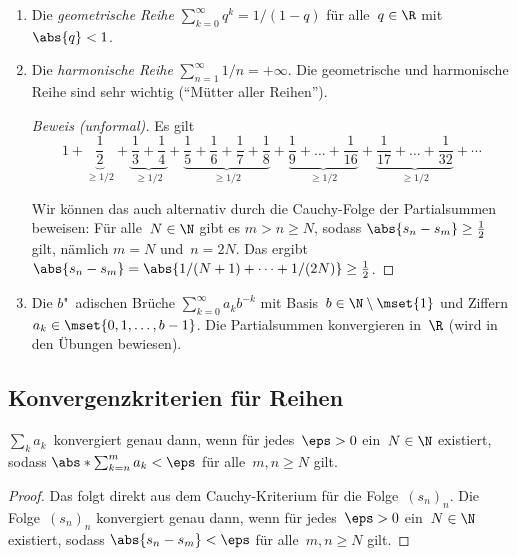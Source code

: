 \documentclass[a4paper]{article}
\begin{document}
\begin{example}\leavevmode
    \begin{enumerate}
        \item Die \emph{geometrische Reihe} $\sum_{k=0}^\infty q^k = 1/(1-q)$ für alle~$q \in \R$ mit~$\abs{q} < 1$.
        \item Die \emph{harmonische Reihe} $\sum_{n=1}^\infty 1/n = +\infty$. Die geometrische und harmonische Reihe sind sehr wichtig ("`Mütter aller Reihen"').
        \begin{proof}[Beweis (unformal)]
            Es gilt
            \begin{equation*}
                1 + \underbrace{\frac{1}{2}}_{\geq 1/2} + \underbrace{\frac{1}{3} + \frac{1}{4}}_{\geq 1/2} + \underbrace{\frac{1}{5} + \frac{1}{6} + \frac{1}{7} + \frac{1}{8}}_{\geq 1/2} + \underbrace{\frac{1}{9} + \dots + \frac{1}{16}}_{\geq 1/2} + \underbrace{\frac{1}{17} + \dots + \frac{1}{32}}_{\geq 1/2} + \cdots
            \end{equation*}

            Wir können das auch alternativ durch die Cauchy-Folge der Partialsummen beweisen: Für alle~$N \in \N$ gibt es $m > n \geq N$, sodass $\abs{s_n - s_m} \geq \frac{1}{2}$ gilt, nämlich $m = N$ und~$n = 2N$. Das ergibt $\abs{s_n - s_m} = \abs{1/(N+1) + \dots + 1/(2N)} \geq \frac{1}{2}$.
        \end{proof}
        \item Die $b$"~adischen Brüche $\sum_{k=0}^\infty a_k b^{-k}$ mit Basis~$b \in \N\setminus\mset{1}$ und Ziffern $a_k \in \mset{0, 1, \dots, b-1}$. Die Partialsummen konvergieren in~$\R$ (wird in den Übungen bewiesen).
    \end{enumerate}
\end{example}

\subsection{Konvergenzkriterien für Reihen}

\begin{theorem}
    $\sum_k a_k$~konvergiert genau dann, wenn für jedes~$\eps > 0$ ein~$N \in \N$ existiert, sodass $\abs*{\sum_{k=n}^m a_k} < \eps$ für alle~$m, n \geq N$ gilt.
\end{theorem}

\begin{proof}
    Das folgt direkt aus dem Cauchy-Kriterium für die Folge~$(s_n)_n$. Die Folge~$(s_n)_n$ konvergiert genau dann, wenn für jedes~$\eps > 0$ ein~$N \in \N$ existiert, sodass $\abs{s_n-s_m} < \eps$ für alle~$m, n \geq N$ gilt.
\end{proof}
\end{document}
